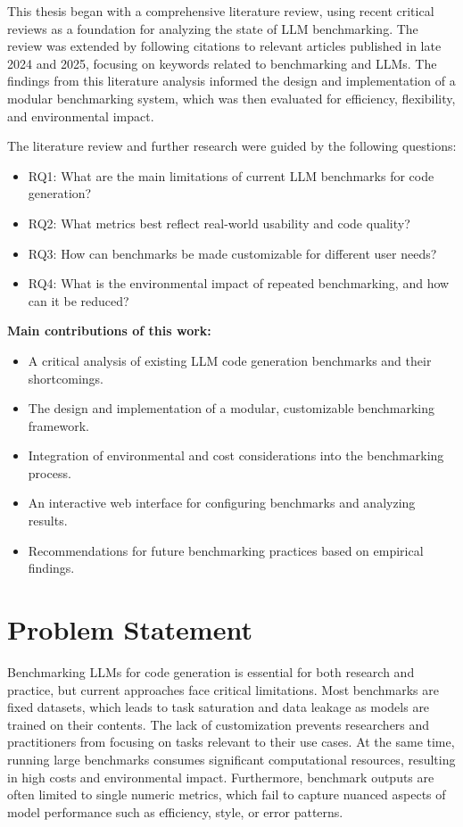This thesis began with a comprehensive literature review, using recent critical reviews as a foundation for analyzing the state of LLM benchmarking.
The review was extended by following citations to relevant articles published in late 2024 and 2025, focusing on keywords related to benchmarking and LLMs.
The findings from this literature analysis informed the design and implementation of a modular benchmarking system, which was then evaluated for efficiency, flexibility, and environmental impact.

The literature review and further research were guided by the following questions:
\begin{itemize}
    \item RQ1: What are the main limitations of current LLM benchmarks for code generation?
    \item RQ2: What metrics best reflect real-world usability and code quality?
    \item RQ3: How can benchmarks be made customizable for different user needs?
    \item RQ4: What is the environmental impact of repeated benchmarking, and how can it be reduced?
\end{itemize}

\textbf{Main contributions of this work:}
\begin{itemize}
    \item A critical analysis of existing LLM code generation benchmarks and their shortcomings.
    \item The design and implementation of a modular, customizable benchmarking framework.
    \item Integration of environmental and cost considerations into the benchmarking process.
    \item An interactive web interface for configuring benchmarks and analyzing results.
    \item Recommendations for future benchmarking practices based on empirical findings.
\end{itemize}

\section{Problem Statement}

Benchmarking LLMs for code generation is essential for both research and practice, but current approaches face critical limitations.
Most benchmarks are fixed datasets, which leads to task saturation and data leakage as models are trained on their contents.
The lack of customization prevents researchers and practitioners from focusing on tasks relevant to their use cases.
At the same time, running large benchmarks consumes significant computational resources, resulting in high costs and environmental impact. Furthermore, benchmark outputs are often limited to single numeric metrics, which fail to capture nuanced aspects of model performance such as efficiency, style, or error patterns.

